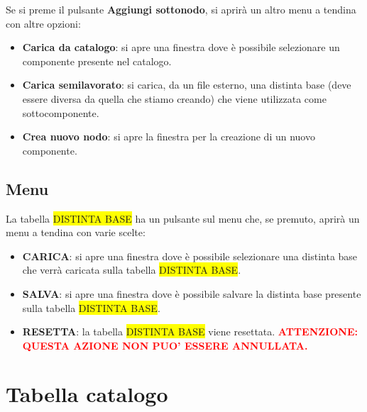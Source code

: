 \documentclass[12pt,twoside]{report}
\newcommand{\coloredbold}[2]{\textcolor{#1}{\textbf{#2}}}
\begin{document}
\bigskip
Se si preme il pulsante \textbf{Aggiungi sottonodo}, si aprirà un altro menu a tendina con altre opzioni:

\begin{itemize}
	
	\item \textbf{Carica da catalogo}: si apre una finestra dove è possibile selezionare un componente presente nel catalogo.
	\item \textbf{Carica semilavorato}: si carica, da un file esterno, una distinta base (deve essere diversa da quella che stiamo creando) che viene utilizzata come sottocomponente.
	\item \textbf{Crea nuovo nodo}: si apre la finestra per la creazione di un nuovo componente.
	      	            
\end{itemize}



\subsection{Menu}

La tabella \colorbox{yellow}{DISTINTA BASE} ha un pulsante sul menu che, se premuto, aprirà un menu a tendina con varie scelte:

\begin{itemize}
	
	\item \textbf{CARICA}: si apre una finestra dove è possibile selezionare una distinta base che verrà caricata sulla tabella \colorbox{yellow}{DISTINTA BASE}.
	\item \textbf{SALVA}: si apre una finestra dove è possibile salvare la distinta base presente sulla tabella \colorbox{yellow}{DISTINTA BASE}.
	\item \textbf{RESETTA}: la tabella \colorbox{yellow}{DISTINTA BASE} viene resettata. 
	      \coloredbold{red}{ATTENZIONE: QUESTA AZIONE NON PUO’ ESSERE ANNULLATA.}
	      
\end{itemize}

\newpage
\section{Tabella catalogo}
\end{document}
